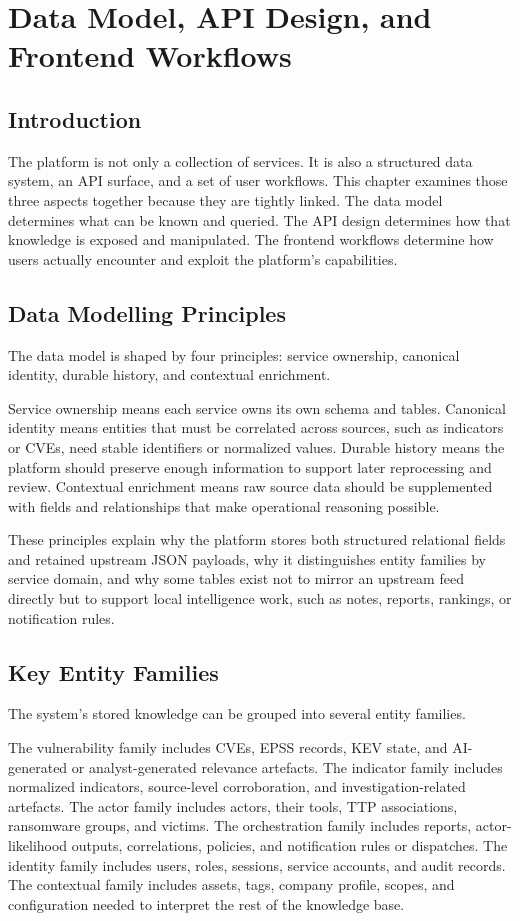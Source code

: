 \chapter{Data Model, API Design, and Frontend Workflows}
\thispagestyle{plain}
\section*{Introduction}
The platform is not only a collection of services. It is also a structured data system, an API surface, and a set of user workflows. This chapter examines those three aspects together because they are tightly linked. The data model determines what can be known and queried. The API design determines how that knowledge is exposed and manipulated. The frontend workflows determine how users actually encounter and exploit the platform's capabilities.

\section{Data Modelling Principles}
The data model is shaped by four principles: service ownership, canonical identity, durable history, and contextual enrichment.

Service ownership means each service owns its own schema and tables. Canonical identity means entities that must be correlated across sources, such as indicators or CVEs, need stable identifiers or normalized values. Durable history means the platform should preserve enough information to support later reprocessing and review. Contextual enrichment means raw source data should be supplemented with fields and relationships that make operational reasoning possible.

These principles explain why the platform stores both structured relational fields and retained upstream JSON payloads, why it distinguishes entity families by service domain, and why some tables exist not to mirror an upstream feed directly but to support local intelligence work, such as notes, reports, rankings, or notification rules.

\section{Key Entity Families}
The system's stored knowledge can be grouped into several entity families.

The vulnerability family includes CVEs, EPSS records, KEV state, and AI-generated or analyst-generated relevance artefacts. The indicator family includes normalized indicators, source-level corroboration, and investigation-related artefacts. The actor family includes actors, their tools, TTP associations, ransomware groups, and victims. The orchestration family includes reports, actor-likelihood outputs, correlations, policies, and notification rules or dispatches. The identity family includes users, roles, sessions, service accounts, and audit records. The contextual family includes assets, tags, company profile, scopes, and configuration needed to interpret the rest of the knowledge base.

